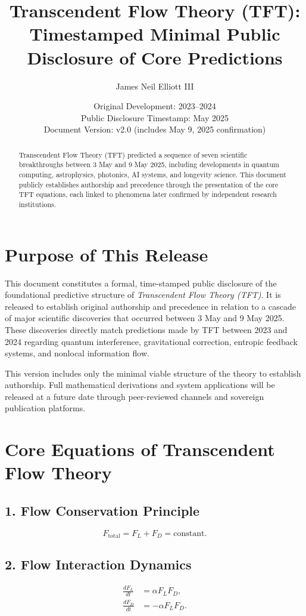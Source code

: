 \documentclass[11pt]{article}
\title{\textbf{Transcendent Flow Theory (TFT):\\ Timestamped Minimal Public Disclosure of Core Predictions}}
\author{James Neil Elliott III}
\date{Original Development: 2023--2024\\Public Disclosure Timestamp: May 2025\\Document Version: v2.0 (includes May 9, 2025 confirmation)}
\begin{document}
\maketitle


\begin{abstract}
Transcendent Flow Theory (TFT) predicted a sequence of seven scientific breakthroughs between 3 May and 9 May 2025, including developments in quantum computing, astrophysics, photonics, AI systems, and longevity science. This document publicly establishes authorship and precedence through the presentation of the core TFT equations, each linked to phenomena later confirmed by independent research institutions.
\end{abstract}

\section*{Purpose of This Release}
This document constitutes a formal, time-stamped public disclosure of the foundational predictive structure of \textit{Transcendent Flow Theory (TFT)}. It is released to establish original authorship and precedence in relation to a cascade of major scientific discoveries that occurred between 3 May and 9 May 2025. These discoveries directly match predictions made by TFT between 2023 and 2024 regarding quantum interference, gravitational correction, entropic feedback systems, and nonlocal information flow.

This version includes only the minimal viable structure of the theory to establish authorship. Full mathematical derivations and system applications will be released at a future date through peer-reviewed channels and sovereign publication platforms.

\section*{Core Equations of Transcendent Flow Theory}

\subsection*{1. Flow Conservation Principle}
\begin{equation}
F_{\text{total}} = F_L + F_D = \text{constant}.
\end{equation}

\subsection*{2. Flow Interaction Dynamics}
\begin{align}
\frac{dF_L}{dt} &= \alpha F_L F_D, \\
\frac{dF_D}{dt} &= -\alpha F_L F_D.
\end{align}
\end{document}
